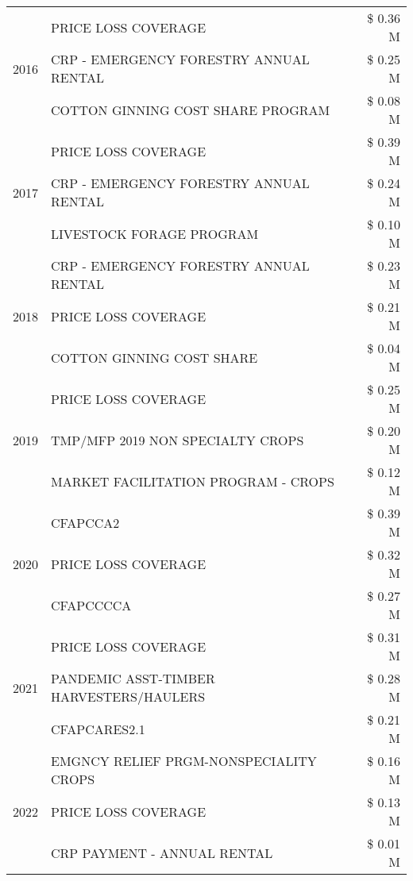 \begin{tabular}{llr}
\cline{1-3}
\multirow[t]{3}{*}{2016} & PRICE LOSS COVERAGE & \$ 0.36 M \\
 & CRP - EMERGENCY FORESTRY ANNUAL RENTAL & \$ 0.25 M \\
 & COTTON GINNING COST SHARE PROGRAM & \$ 0.08 M \\
\cline{1-3}
\multirow[t]{3}{*}{2017} & PRICE LOSS COVERAGE & \$ 0.39 M \\
 & CRP - EMERGENCY FORESTRY ANNUAL RENTAL & \$ 0.24 M \\
 & LIVESTOCK FORAGE PROGRAM & \$ 0.10 M \\
\cline{1-3}
\multirow[t]{3}{*}{2018} & CRP - EMERGENCY FORESTRY ANNUAL RENTAL & \$ 0.23 M \\
 & PRICE LOSS COVERAGE & \$ 0.21 M \\
 & COTTON GINNING COST SHARE & \$ 0.04 M \\
\cline{1-3}
\multirow[t]{3}{*}{2019} & PRICE LOSS COVERAGE & \$ 0.25 M \\
 & TMP/MFP 2019 NON SPECIALTY CROPS & \$ 0.20 M \\
 & MARKET FACILITATION PROGRAM - CROPS & \$ 0.12 M \\
\cline{1-3}
\multirow[t]{3}{*}{2020} & CFAPCCA2 & \$ 0.39 M \\
 & PRICE LOSS COVERAGE & \$ 0.32 M \\
 & CFAPCCCCA & \$ 0.27 M \\
\cline{1-3}
\multirow[t]{3}{*}{2021} & PRICE LOSS COVERAGE & \$ 0.31 M \\
 & PANDEMIC ASST-TIMBER HARVESTERS/HAULERS & \$ 0.28 M \\
 & CFAPCARES2.1 & \$ 0.21 M \\
\cline{1-3}
\multirow[t]{3}{*}{2022} & EMGNCY RELIEF PRGM-NONSPECIALITY CROPS & \$ 0.16 M \\
 & PRICE LOSS COVERAGE & \$ 0.13 M \\
 & CRP PAYMENT - ANNUAL RENTAL & \$ 0.01 M \\
\cline{1-3}
\bottomrule
\end{tabular}
